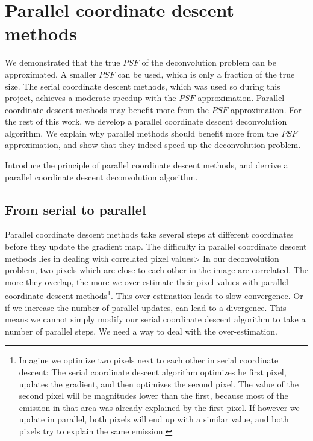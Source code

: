 \section{Parallel coordinate descent methods}\label{pcdm}
We demonstrated that the true $PSF$ of the deconvolution problem can be approximated. A smaller $PSF$ can be used, which is only a fraction of the true size. The serial coordinate descent methods, which was used so during this project, achieves a moderate speedup with the $PSF$ approximation. Parallel coordinate descent methods may benefit more from the $PSF$ approximation. For the rest of this work, we develop a parallel coordinate descent deconvolution algorithm. We explain why parallel methods should benefit more from the $PSF$ approximation, and show that they indeed speed up the deconvolution problem.


Introduce the principle of parallel coordinate descent methods, and derrive a parallel coordinate descent deconvolution algorithm.




\subsection{From serial to parallel}
Parallel coordinate descent methods take several steps at different coordinates before they update the gradient map. The difficulty in parallel coordinate descent methods lies in dealing with correlated pixel values> In our deconvolution problem, two pixels which are close to each other in the image are correlated. The more they overlap, the more we over-estimate their pixel values with parallel coordinate descent methods\footnote{Imagine we optimize two pixels next to each other in serial coordinate descent: The serial coordinate descent algorithm  optimizes he first pixel, updates the gradient, and then optimizes the second pixel. The value of the second pixel will be magnitudes lower than the first, because most of the emission in that area was already explained by the first pixel. If however we update in parallel, both pixels will end up with a similar value, and both pixels try to explain the same emission.}. This over-estimation leads to slow convergence. Or if we increase the number of parallel updates, can lead to a divergence. This means we cannot simply modify our serial coordinate descent algorithm to take a number of parallel steps. We need a way to deal with the over-estimation. 

